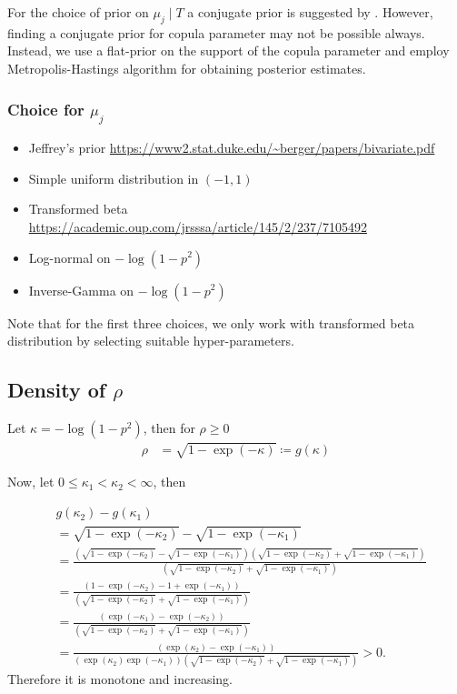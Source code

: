 \documentclass{amsart}
\begin{document}
For the choice of prior on $\mu_j\mid T$ a conjugate prior is suggested by \citet{chipman_BART,serafini2024lossbasedpriortreetopologies}. However, finding a conjugate prior for copula parameter may not be possible always. Instead, we use a flat-prior on the support of the copula parameter and employ Metropolis-Hastings algorithm for obtaining posterior estimates.


\iffalse

\subsubsection{Choice for $\mu_j$}
\begin{itemize}
    \item Jeffrey's prior \url{https://www2.stat.duke.edu/~berger/papers/bivariate.pdf}
    \item Simple uniform distribution in $(-1,1)$ 
    \item Transformed beta \url{https://academic.oup.com/jrsssa/article/145/2/237/7105492}
    \item Log-normal on $-\log(1-p^2)$
    \item Inverse-Gamma on $-\log(1-p^2)$
\end{itemize}
Note that for the first three choices, we only work with transformed beta distribution by 
selecting suitable hyper-parameters.

\subsection{Density of $\rho$}

Let $\kappa = -\log(1-p^2)$, then for $\rho \ge 0$
\begin{align}
	\rho & = \sqrt{1-\exp(-\kappa)}\coloneqq g(\kappa)
\end{align}

Now, let $0\le\kappa_1 < \kappa_2<\infty$, then

\begin{align}
	&g(\kappa_2) - g(\kappa_1)\\
	&=\sqrt{1-\exp(-\kappa_2)} - \sqrt{1-\exp(-\kappa_1)}\\
	&= \frac{(\sqrt{1-\exp(-\kappa_2)} - \sqrt{1-\exp(-\kappa_1)})(\sqrt{1-\exp(-\kappa_2)} + \sqrt{1-\exp(-\kappa_1)})}{(\sqrt{1-\exp(-\kappa_2)} + \sqrt{1-\exp(-\kappa_1)})}\\
	&= \frac{(1-\exp(-\kappa_2) - 1+\exp(-\kappa_1))}{(\sqrt{1-\exp(-\kappa_2)} + \sqrt{1-\exp(-\kappa_1)})}\\
	&= \frac{(\exp(-\kappa_1)-\exp(-\kappa_2))}{(\sqrt{1-\exp(-\kappa_2)} + \sqrt{1-\exp(-\kappa_1)})}\\
	&= \frac{(\exp(\kappa_2)-\exp(-\kappa_1))}
	{(\exp(\kappa_2)\exp(-\kappa_1))(\sqrt{1-\exp(-\kappa_2)} + \sqrt{1-\exp(-\kappa_1)})} >0.
\end{align}
Therefore it is monotone and increasing.
\end{document}
